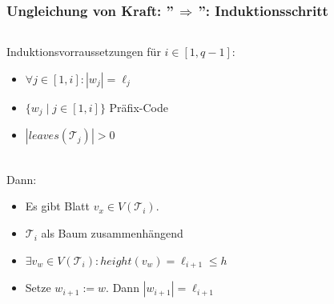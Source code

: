 \documentclass{beamer}
\begin{document}
\begin{frame}[t]
    \frametitle{Ungleichung von Kraft: ''$\,\Longrightarrow\,$'': Induktionsschritt}

    \begin{columns}
    \begin{column}{0.7\textwidth}
        Induktionsvorraussetzungen für $i \in [1,q-1]$:
        \begin{itemize}
            \setlength\itemsep{.8em}
            \item $\forall j \in [1,i]: |w_j| = \ell_j$
            \item $\{w_j \mid j \in [1,i]\}$ Präfix-Code
            \item $|leaves(\mathcal{T}_j)| > 0$
        \end{itemize}\strut\\[10pt]
        \pause
        Dann:
        \begin{itemize}
            \setlength\itemsep{.8em}
            \item Es gibt Blatt $v_x \in V(\mathcal{T}_i)$.
            \item $\mathcal{T}_i$ als Baum zusammenhängend
            \pause
            \item $\exists v_w \in V(\mathcal{T}_i): height(v_w) = \ell_{i+1} \leq h$
            \pause
            \item Setze $w_{i+1} := w$. Dann $|w_{i+1}| = \ell_{i+1}$
        \end{itemize}
    \end{column}
    \begin{column}{0.3\textwidth}\onslide
    \end{column}
    \end{columns}
\end{frame}
\end{document}

